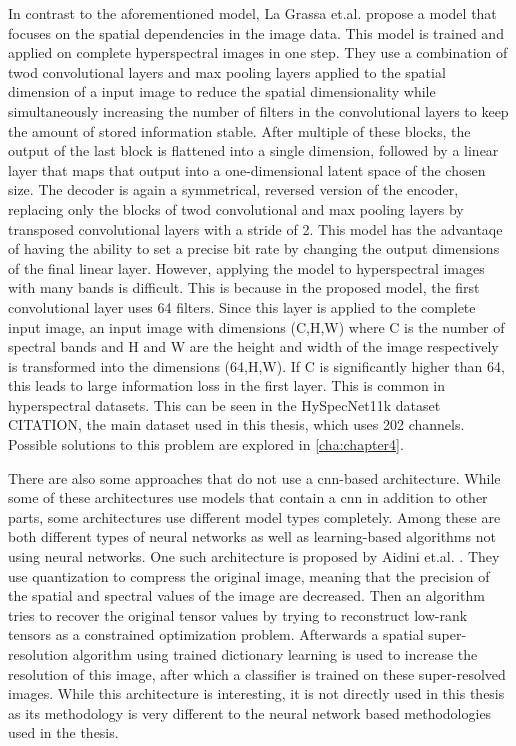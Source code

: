 In contrast to the aforementioned model, La Grassa et.al. \citep{la_grassa_hyperspectral_2022} propose a model that focuses on the spatial dependencies in the image data. This model is trained and applied on complete hyperspectral images in one step. They use a combination of \ac{twod} convolutional layers and max pooling layers applied to the spatial dimension of a input image to reduce the spatial dimensionality while simultaneously increasing the number of filters in the convolutional layers to keep the amount of stored information stable. After multiple of these blocks, the output of the last block is flattened into a single dimension, followed by a linear layer that maps that output into a one-dimensional latent space of the chosen size. The decoder is again a symmetrical, reversed version of the encoder, replacing only the blocks of \ac{twod} convolutional and max pooling layers by transposed convolutional layers with a stride of 2. This model has the advantaqe of having the ability to set a precise bit rate by changing the output dimensions of the final linear layer. However, applying the model to hyperspectral images with many bands is difficult. This is because in the proposed model, the first convolutional layer uses 64 filters. Since this layer is applied to the complete input image, an input image with dimensions (C,H,W) where C is the number of spectral bands and H and W are the height and width of the image respectively is transformed into the dimensions (64,H,W). If C is significantly higher than 64, this leads to large information loss in the first layer. This is common in hyperspectral datasets. This can be seen in the HySpecNet11k dataset CITATION, the main dataset used in this thesis, which uses 202 channels. Possible solutions to this problem are explored in \autoref{cha:chapter4}.

There are also some approaches that do not use a \ac{cnn}-based architecture. While some of these architectures use models that contain a \ac{cnn} in addition to other parts, some architectures use different model types completely. Among these are both different types of neural networks as well as learning-based algorithms not using neural networks.
One such architecture is proposed by Aidini et.al. \citep{aidini_hyperspectral_2019}. They use quantization to compress the original image, meaning that the precision of the spatial and spectral values of the image are decreased. Then an algorithm tries to recover the original tensor values by trying to reconstruct low-rank tensors as a constrained optimization problem. Afterwards a spatial super-resolution algorithm using trained dictionary learning is used to increase the resolution of this image, after which a classifier is trained on these super-resolved images. While this architecture is interesting, it is not directly used in this thesis as its methodology is very different to the neural network based methodologies used in the thesis.

